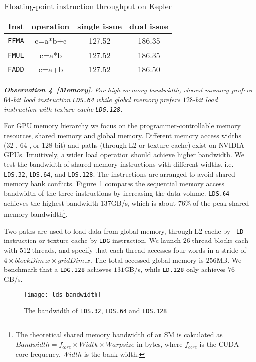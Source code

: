 \begin{table}[htbp]
\caption{\small Floating-point instruction throughput on Kepler}
\centering
\scalebox{0.8} {
\begin{tabular}{|c|c|c|c|}
\hline
Inst &operation&single issue&dual issue\\
\hline
{\tt FFMA} &c=a*b+c&127.52&186.35 \\
\hline
{\tt FMUL} &c=a*b&127.52&186.35 \\
\hline
{\tt FADD} &c=a+b&127.52&186.50\\
\hline
\end{tabular}
}
\label{tab:ffma}
\end{table}

{\em {\bf Observation 4--[Memory]}: For high memory bandwidth, shared memory prefers $64$-bit load
instruction {\tt LDS.64} while global memory prefers $128$-bit load instruction with texture cache {\tt LDG.128}.}

For GPU memory hierarchy we focus on the programmer-controllable memory resources, shared memory and global memory.
Different memory access widths (32-, 64-, or 128-bit) and paths (through L2 or texture cache) exist on NVIDIA GPUs.
Intuitively, a wider load operation should achieve higher bandwidth.
We test the bandwidth of shared memory instructions with different widths, i.e. {\tt LDS.32}, {\tt LDS.64}, and {\tt LDS.128}.
The instructions are arranged to avoid shared memory bank conflicts.
Figure~\ref{fig:lds_bw} compares the sequential memory access bandwidth of the three instructions by increasing the data volume.
{\tt LDS.64} achieves the highest bandwidth $137$GB/s, which is about $76\%$ of the peak shared memory bandwidth\footnote{The
theoretical shared memory bandwidth of an SM is calculated as $Bandwidth = f_{core} \times Width \times Warpsize$ in bytes, where $f_{core}$ is the CUDA core frequency, $Width$ is the bank width.}.

Two paths are used to load data from global memory, through L2 cache by {\tt
LD} instruction or texture cache by {\tt LDG} instruction.
We launch $26$ thread blocks each with $512$ threads, and specify that each thread accesses four words in a stride of $4 \times blockDim.x \times gridDim.x$.
The total accessed global memory is $256$MB.
We benchmark that a {\tt LDG.128} achieves $131$GB/s, while {\tt LD.128} only achieves $76$GB/s.

\begin{figure}[htbp]
\begin{center}
\texttt{[image: lds\_bandwidth]}
    \caption{\small The bandwidth of {\tt LDS.32}, {\tt LDS.64} and {\tt LDS.128}}
\label{fig:lds_bw}
\end{center}
\end{figure}
